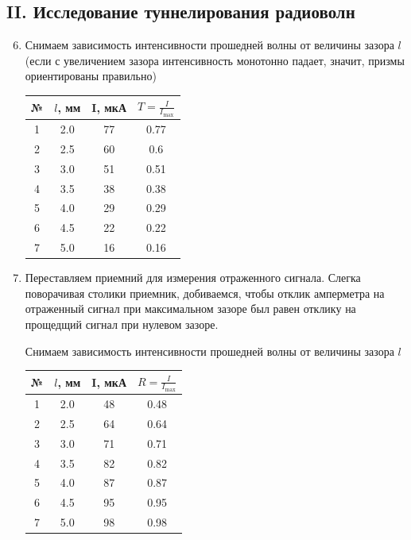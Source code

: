 \documentclass[a4paper,12pt]{article}
\begin{document}
\subsection{II. Исследование туннелирования радиоволн}
\begin{enumerate}
    \setcounter{enumi}{5}
    \item Снимаем зависимость интенсивности прошедней волны от величины зазора $l$ (если с увеличением зазора интенсивность монотонно падает, значит, призмы ориентированы правильно)
    
    \begin{table}[h!]
    \centering
        \begin{tabular}{||c|c|c|c||} 
        \hline
        № & $l$, мм & I, мкА & $T=\frac{I}{I_\text{max}}$ \\ [0.5ex] 
        \hline\hline
        1 & 2.0 & 77 & 0.77 \\ 
        2 & 2.5 & 60 & 0.6 \\
        3 & 3.0 & 51 & 0.51 \\
        4 & 3.5 & 38 & 0.38 \\
        5 & 4.0 & 29 & 0.29 \\
        6 & 4.5 & 22 & 0.22 \\
        7 & 5.0 & 16 & 0.16 \\ [1ex] 
        \hline
        \end{tabular}
    \end{table}
    \item Переставляем приемний для измерения отраженного сигнала. Слегка поворачивая столики приемник, добиваемся, чтобы отклик амперметра на отраженный сигнал при максимальном зазоре был равен отклику на прощедщий сигнал при нулевом зазоре.

    Снимаем зависимость интенсивности прошедней волны от величины зазора $l$
    
    \begin{table}[h!]
    \centering
        \begin{tabular}{||c|c|c|c||} 
        \hline
        № & $l$, мм & I, мкА & $R=\frac{I}{I_\text{max}}$  \\ [0.5ex] 
        \hline\hline
        1 & 2.0 & 48 & 0.48 \\ 
        2 & 2.5 & 64 & 0.64 \\
        3 & 3.0 & 71 & 0.71 \\
        4 & 3.5 & 82 & 0.82 \\
        5 & 4.0 & 87 & 0.87 \\
        6 & 4.5 & 95 & 0.95 \\
        7 & 5.0 & 98 & 0.98 \\ [1ex] 
        \hline
        \end{tabular}
    \end{table}


\end{enumerate}
\end{document}
